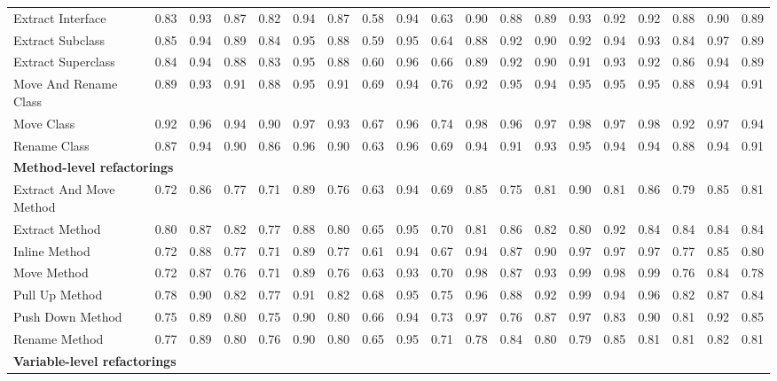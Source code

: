 \begin{table}[!ht]
{\begin{tabular}{l c c c|c c c|c c c|c c c|c c c|c c c}
 Extract Interface & 0.83 & 0.93 & 0.87 & 0.82 & 0.94 & 0.87 & 0.58 & 0.94 & 0.63 & 0.90 & 0.88 & 0.89 & 0.93 & 0.92 & 0.92 & 0.88 & 0.90 & 0.89 \\
 Extract Subclass & 0.85 & 0.94 & 0.89 & 0.84 & 0.95 & 0.88 & 0.59 & 0.95 & 0.64 & 0.88 & 0.92 & 0.90 & 0.92 & 0.94 & 0.93 & 0.84 & 0.97 & 0.89 \\
 Extract Superclass & 0.84 & 0.94 & 0.88 & 0.83 & 0.95 & 0.88 & 0.60 & 0.96 & 0.66 & 0.89 & 0.92 & 0.90 & 0.91 & 0.93 & 0.92 & 0.86 & 0.94 & 0.89 \\
 Move And Rename Class & 0.89 & 0.93 & 0.91 & 0.88 & 0.95 & 0.91 & 0.69 & 0.94 & 0.76 & 0.92 & 0.95 & 0.94 & 0.95 & 0.95 & 0.95 & 0.88 & 0.94 & 0.91 \\
 Move Class & 0.92 & 0.96 & 0.94 & 0.90 & 0.97 & 0.93 & 0.67 & 0.96 & 0.74 & 0.98 & 0.96 & 0.97 & 0.98 & 0.97 & 0.98 & 0.92 & 0.97 & 0.94 \\
 Rename Class & 0.87 & 0.94 & 0.90 & 0.86 & 0.96 & 0.90 & 0.63 & 0.96 & 0.69 & 0.94 & 0.91 & 0.93 & 0.95 & 0.94 & 0.94 & 0.88 & 0.94 & 0.91 \\
\hline \multicolumn{19}{l}{ \textbf{Method-level refactorings} } \\
 Extract And Move Method & 0.72 & 0.86 & 0.77 & 0.71 & 0.89 & 0.76 & 0.63 & 0.94 & 0.69 & 0.85 & 0.75 & 0.81 & 0.90 & 0.81 & 0.86 & 0.79 & 0.85 & 0.81 \\
 Extract Method & 0.80 & 0.87 & 0.82 & 0.77 & 0.88 & 0.80 & 0.65 & 0.95 & 0.70 & 0.81 & 0.86 & 0.82 & 0.80 & 0.92 & 0.84 & 0.84 & 0.84 & 0.84 \\
 Inline Method & 0.72 & 0.88 & 0.77 & 0.71 & 0.89 & 0.77 & 0.61 & 0.94 & 0.67 & 0.94 & 0.87 & 0.90 & 0.97 & 0.97 & 0.97 & 0.77 & 0.85 & 0.80 \\
 Move Method & 0.72 & 0.87 & 0.76 & 0.71 & 0.89 & 0.76 & 0.63 & 0.93 & 0.70 & 0.98 & 0.87 & 0.93 & 0.99 & 0.98 & 0.99 & 0.76 & 0.84 & 0.78 \\
 Pull Up Method & 0.78 & 0.90 & 0.82 & 0.77 & 0.91 & 0.82 & 0.68 & 0.95 & 0.75 & 0.96 & 0.88 & 0.92 & 0.99 & 0.94 & 0.96 & 0.82 & 0.87 & 0.84 \\
 Push Down Method & 0.75 & 0.89 & 0.80 & 0.75 & 0.90 & 0.80 & 0.66 & 0.94 & 0.73 & 0.97 & 0.76 & 0.87 & 0.97 & 0.83 & 0.90 & 0.81 & 0.92 & 0.85 \\
 Rename Method & 0.77 & 0.89 & 0.80 & 0.76 & 0.90 & 0.80 & 0.65 & 0.95 & 0.71 & 0.78 & 0.84 & 0.80 & 0.79 & 0.85 & 0.81 & 0.81 & 0.82 & 0.81 \\
\hline \multicolumn{19}{l}{\textbf{Variable-level refactorings} } \\

\end{tabular}}
\end{table}
